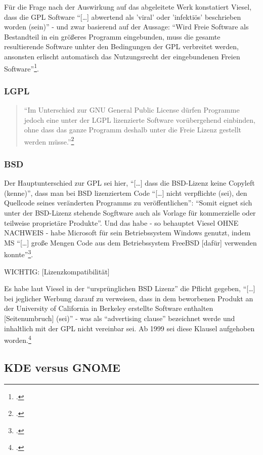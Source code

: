 \documentclass[DIV=calc,BCOR=5mm,11pt,headings=small,oneside,abstract=true, toc=bib]{scrartcl}
\begin{document}
Für die Frage nach der Auswirkung auf das abgeleitete Werk konstatiert Viesel,
dass die GPL Software \enquote{[\ldots] abwertend als 'viral' oder
'infektiös' beschrieben worden (sein)} - und zwar basierend auf der
Aussage: \enquote{Wird Freie Software als Bestandteil in ein größeres
Programm eingebunden, muss die gesamte resultierende Software unhter den
Bedingungen der GPL verbreitet werden, ansonsten erlischt automatisch das
Nutzungsrecht der eingebundenen Freien
Software}\footcite[vgl.][63]{Viesel2006a}.

\subsubsection{LGPL}
\begin{quote}\enquote{Im Unterschied zur GNU General Public License dürfen
Programme jedoch eine unter der LGPL lizenzierte Software vorübergehend
einbinden, ohne dass das ganze Programm deshalb unter die Freie Lizenz
gestellt werden müsse.}\footcite[vgl.][66]{Viesel2006a}
\end{quote}

\subsubsection{BSD}

Der Hauptunterschied zur GPL sei hier, \enquote{[\ldots] dass die
BSD-Lizenz keine Copyleft (kenne)}, dass man bei BSD lizenziertem Code
\enquote{[\ldots] nicht verpflichte (sei), den Quellcode seines veränderten
Programms zu veröffentlichen}: \enquote{Somit eignet sich unter der
BSD-Lizenz stehende Sogftware auch als Vorlage für kommerzielle oder
teilweise proprietäre Produkte}. Und das habe - so behauptet Viesel OHNE
NACHWEIS - habe Microsoft für sein Betriebssystem Windows genutzt, indem MS
\enquote{[\ldots] große Mengen Code aus dem Betriebssystem FreeBSD [dafür]
verwenden konnte}\footcite[vgl.][67]{Viesel2006a}.

WICHTIG: [Lizenzkompatibilität]

Es habe laut Viesel in der \enquote{ursprünglichen BSD Lizenz} die Pflicht
gegeben, \enquote{[\ldots] bei jeglicher Werbung darauf zu verweisen, dass
in dem beworbenen Produkt an der University of California in Berkeley
erstellte Software enthalten [Seitenumbruch] (sei)} - was als
\enquote{advertising clause} bezeichnet werde und inhaltlich mit der GPL
nicht vereinbar sei. Ab 1999 sei diese Klausel aufgehoben
worden.\footcite[vgl.][67f]{Viesel2006a}

\subsection{KDE versus GNOME}
\end{document}
